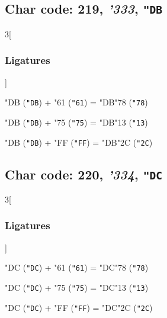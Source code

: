 \documentclass{article}
\newlength{\maxcharwidth}
\begin{document}
\subsection{Char code: 219, {\it'333}, {\tt"DB}}
\label{char_219}


\begin{multicols}{3}[\subsubsection{Ligatures}]

{\testfont\char"DB\noboundary} ({\tt"DB}) + {\testfont\char"61\noboundary} ({\tt"61}) = {\testfont\char"DB\noboundary}{\testfont\char"78\noboundary} ({\tt"78}) 

{\testfont\char"DB\noboundary} ({\tt"DB}) + {\testfont\char"75\noboundary} ({\tt"75}) = {\testfont\char"DB\noboundary}{\testfont\char"13\noboundary} ({\tt"13}) 

{\testfont\char"DB\noboundary} ({\tt"DB}) + {\testfont\char"FF\noboundary} ({\tt"FF}) = {\testfont\char"DB\noboundary}{\testfont\char"2C\noboundary} ({\tt"2C}) 

\end{multicols}

\subsection{Char code: 220, {\it'334}, {\tt"DC}}
\label{char_220}


\begin{multicols}{3}[\subsubsection{Ligatures}]

{\testfont\char"DC\noboundary} ({\tt"DC}) + {\testfont\char"61\noboundary} ({\tt"61}) = {\testfont\char"DC\noboundary}{\testfont\char"78\noboundary} ({\tt"78}) 

{\testfont\char"DC\noboundary} ({\tt"DC}) + {\testfont\char"75\noboundary} ({\tt"75}) = {\testfont\char"DC\noboundary}{\testfont\char"13\noboundary} ({\tt"13}) 

{\testfont\char"DC\noboundary} ({\tt"DC}) + {\testfont\char"FF\noboundary} ({\tt"FF}) = {\testfont\char"DC\noboundary}{\testfont\char"2C\noboundary} ({\tt"2C}) 

\end{multicols}
\end{document}
